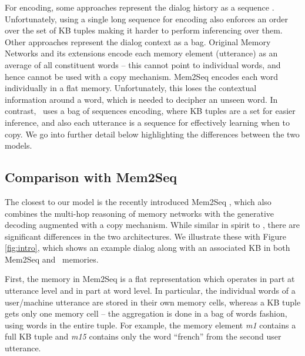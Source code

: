 For encoding, some approaches represent the dialog history as a sequence \cite{eric2017copy,ptr-unk}. Unfortunately, using a single long sequence for encoding also enforces an order over the set of KB tuples making it harder to perform inferencing over them. Other approaches represent the dialog context as a bag. Original Memory Networks \cite{BordesW16} and its extensions encode each memory element (utterance) as an average of all constituent words -- this cannot point to individual words, and hence cannot be used with a copy mechanism. Mem2Seq encodes each word individually in a flat memory. Unfortunately, this loses the contextual information around a word, which is needed to decipher an unseen word. In contrast, \sys\ uses a bag of sequences encoding, where KB tuples are a set for easier inference, and also each utterance is a sequence for effectively learning when to copy. We go into further detail below highlighting the differences between the two models.



\subsection{Comparison with Mem2Seq}
\label{sec:relatedmem2seq}
The closest to our model is the recently introduced Mem2Seq \cite{mem2seq}, which also combines the multi-hop reasoning of memory networks with the generative decoding augmented with a copy mechanism. While similar in spirit to \sys, there are significant differences in the two architectures. We illustrate these with Figure \ref{fig:intro}, which shows an example dialog along with an associated KB in both Mem2Seq and \sys\ memories. %

First, the memory in Mem2Seq is a flat representation which operates in part at utterance level and in part at word level. In particular, the individual words of a user/machine utterance are stored in their own memory cells, whereas a KB tuple gets only one memory cell -- the aggregation is done in a bag of words fashion, using words in the entire tuple. For example, the memory element \textit{m1} contains a full KB tuple and \textit{m15} contains only the word ``french'' from the second user utterance.

